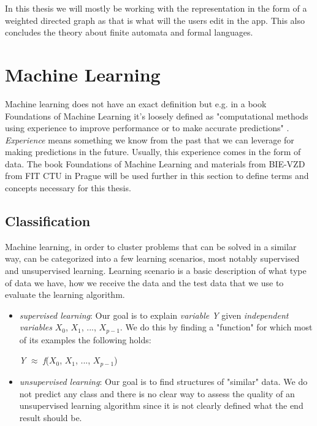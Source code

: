 In this thesis we will mostly be working with the representation in the form of a weighted directed graph as that is what will the users edit in the app.
This also concludes the theory about finite automata and formal languages.

\section{Machine Learning}

Machine learning does not have an exact definition but e.g. in a book Foundations of Machine Learning it's loosely defined as "computational methods using experience to improve performance or to make accurate predictions" \cite{ml-foundations}. \textit{Experience} means something we know from the past that we can leverage for making predictions in the future. Usually, this experience comes in the form of data. The book Foundations of Machine Learning \cite{ml-foundations} and materials from BIE-VZD from FIT CTU in Prague \cite{vzd-lectures} will be used further in this section to define terms and concepts necessary for this thesis.

\subsection{Classification}

Machine learning, in order to cluster problems that can be solved in a similar way, can be categorized into a few learning scenarios, most notably supervised and unsupervised learning. Learning scenario is a basic description of what type of data we have, how we receive the data and the test data that we use to evaluate the learning algorithm.

\begin{itemize}
    \item \textit{supervised learning}: Our goal is to explain \textit{variable Y} given \textit{independent variables} $\textit{X}_0$, $\textit{X}_1$, ..., $\textit{X}_{\textit{p} - 1}$. We do this by finding a "function" for which most of its examples the following holds:\\
    \centerline{\textit{Y} $\approx$ \textit{f}($\textit{X}_0$, $\textit{X}_1$, ..., $\textit{X}_{\textit{p} - 1}$)}
    \item \textit{unsupervised learning}: Our goal is to find structures of "similar" data. We do not predict any class and there is no clear way to assess the quality of an unsupervised learning algorithm since it is not clearly defined what the end result should be.
\end{itemize}

